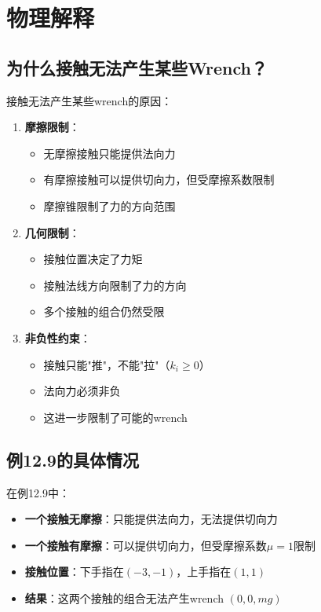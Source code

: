 \documentclass[12pt,a4paper]{article}
\begin{document}
\section{物理解释}

\subsection{为什么接触无法产生某些Wrench？}

接触无法产生某些wrench的原因：

\begin{enumerate}
    \item \textbf{摩擦限制}：
    \begin{itemize}
        \item 无摩擦接触只能提供法向力
        \item 有摩擦接触可以提供切向力，但受摩擦系数限制
        \item 摩擦锥限制了力的方向范围
    \end{itemize}
    
    \item \textbf{几何限制}：
    \begin{itemize}
        \item 接触位置决定了力矩
        \item 接触法线方向限制了力的方向
        \item 多个接触的组合仍然受限
    \end{itemize}
    
    \item \textbf{非负性约束}：
    \begin{itemize}
        \item 接触只能"推"，不能"拉"（$k_i \geq 0$）
        \item 法向力必须非负
        \item 这进一步限制了可能的wrench
    \end{itemize}
\end{enumerate}

\subsection{例12.9的具体情况}

在例12.9中：

\begin{itemize}
    \item \textbf{一个接触无摩擦}：只能提供法向力，无法提供切向力
    \item \textbf{一个接触有摩擦}：可以提供切向力，但受摩擦系数$\mu = 1$限制
    \item \textbf{接触位置}：下手指在$(-3, -1)$，上手指在$(1, 1)$
    \item \textbf{结果}：这两个接触的组合无法产生wrench $(0, 0, mg)$
\end{itemize}
\end{document}
